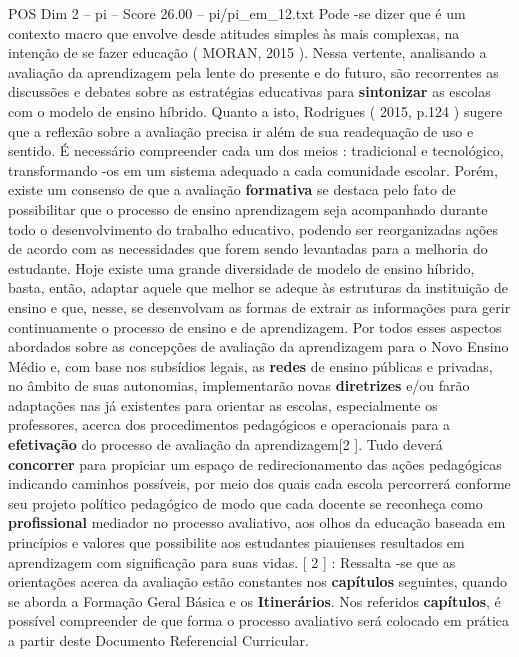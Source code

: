 \begin{textsample}{POS Dim 2 – pi – Score 26.00 – pi/pi\_em\_12.txt}
Pode -se dizer que é um contexto macro que envolve desde atitudes simples às mais complexas, na intenção de se fazer educação ( MORAN, 2015 ).
Nessa vertente, analisando a avaliação da aprendizagem pela lente do presente e do futuro, são recorrentes as discussões e debates sobre as estratégias educativas para \textbf{sintonizar} as escolas com o modelo de ensino híbrido.
Quanto a isto, Rodrigues ( 2015, p.124 ) sugere que a reflexão sobre a avaliação precisa ir além de sua readequação de uso e sentido.
É necessário compreender cada um dos meios : tradicional e tecnológico, transformando -os em um sistema adequado a cada comunidade escolar.
Porém, existe um consenso de que a avaliação \textbf{formativa} se destaca pelo fato de possibilitar que o processo de ensino aprendizagem seja acompanhado durante todo o desenvolvimento do trabalho educativo, podendo ser reorganizadas ações de acordo com as necessidades que forem sendo levantadas para a melhoria do estudante.
Hoje existe uma grande diversidade de modelo de ensino híbrido, basta, então, adaptar aquele que melhor se adeque às estruturas da instituição de ensino e que, nesse, se desenvolvam as formas de extrair as informações para gerir continuamente o processo de ensino e de aprendizagem.
Por todos esses aspectos abordados sobre as concepções de avaliação da aprendizagem para o Novo Ensino Médio e, com base nos subsídios legais, as \textbf{redes} de ensino públicas e privadas, no âmbito de suas autonomias, implementarão novas \textbf{diretrizes} e/ou farão adaptações nas já existentes para orientar as escolas, especialmente os professores, acerca dos procedimentos pedagógicos e operacionais para a \textbf{efetivação} do processo de avaliação da aprendizagem[2 ].
Tudo deverá \textbf{concorrer} para propiciar um espaço de redirecionamento das ações pedagógicas indicando caminhos possíveis, por meio dos quais cada escola percorrerá conforme seu projeto político pedagógico de modo que cada docente se reconheça como \textbf{profissional} mediador no processo avaliativo, aos olhos da educação baseada em princípios e valores que possibilite aos estudantes piauienses resultados em aprendizagem com significação para suas vidas. [ 2 ] : Ressalta -se que as orientações acerca da avaliação estão constantes nos \textbf{capítulos} seguintes, quando se aborda a Formação Geral Básica e os \textbf{Itinerários}.
Nos referidos \textbf{capítulos}, é possível compreender de que forma o processo avaliativo será colocado em prática a partir deste Documento Referencial Curricular.

\end{textsample}
